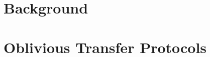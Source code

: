 \documentclass[a4paper,12pt,twoside,openright]{memoir}
\begin{document}
\pagestyle{ruled}



\frontmatter


\tableofcontents


\mainmatter

\part{Background}



\part{Oblivious Transfer Protocols}



\backmatter
%



\end{document}
